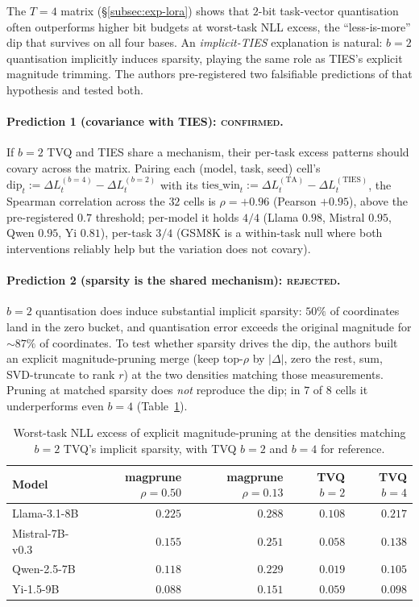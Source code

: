 \label{subsec:exp-b2-mechanism}
The $T = 4$ matrix (\S\ref{subsec:exp-lora}) shows that $2$-bit
task-vector quantisation often outperforms higher bit budgets at
worst-task NLL excess, the ``less-is-more'' dip that survives on all
four bases. An \emph{implicit-TIES} explanation is natural: $b=2$
quantisation implicitly induces sparsity, playing the same role as
TIES's explicit magnitude trimming. The authors pre-registered two falsifiable
predictions of that hypothesis and tested both.

\paragraph{Prediction 1 (covariance with TIES): \textsc{confirmed}.}
If $b=2$ TVQ and TIES share a mechanism, their per-task excess patterns
should covary across the matrix. Pairing each (model, task, seed)
cell's $\text{dip}_t := \Delta L_t^{(b=4)} - \Delta L_t^{(b=2)}$ with
its $\text{ties\_win}_t := \Delta L_t^{(\mathrm{TA})} -
\Delta L_t^{(\mathrm{TIES})}$, the Spearman correlation across the $32$
cells is $\rho = +0.96$ (Pearson $+0.95$), above the pre-registered
$0.7$ threshold; per-model it holds $4/4$ (Llama $0.98$, Mistral
$0.95$, Qwen $0.95$, Yi $0.81$), per-task $3/4$ (GSM8K is a within-task
null where both interventions reliably help but the variation does not
covary).

\paragraph{Prediction 2 (sparsity is the shared mechanism):
\textsc{rejected}.} $b=2$ quantisation does induce substantial implicit
sparsity: $50\%$ of coordinates land in the zero bucket, and
quantisation error exceeds the original magnitude for $\sim 87\%$ of
coordinates. To test whether sparsity drives the dip, the authors built an
explicit magnitude-pruning merge (keep top-$\rho$ by $|\Delta|$, zero
the rest, sum, SVD-truncate to rank $r$) at the two densities matching
those measurements. Pruning at matched sparsity does \emph{not}
reproduce the dip; in $7$ of $8$ cells it underperforms even $b=4$
(Table~\ref{tab:e7-prune-vs-tvq}).

\begin{table}[t]
\centering
\caption{Worst-task NLL excess of explicit magnitude-pruning at the
densities matching $b=2$ TVQ's implicit sparsity, with TVQ $b=2$ and
$b=4$ for reference.}
\label{tab:e7-prune-vs-tvq}
\begin{tabular}{lrrrr}
\hline
Model & magprune $\rho=0.50$ & magprune $\rho=0.13$ & TVQ $b=2$ & TVQ $b=4$ \\
\hline
Llama-3.1-8B    & $0.225$ & $0.288$ & $0.108$ & $0.217$ \\
Mistral-7B-v0.3 & $0.155$ & $0.251$ & $0.058$ & $0.138$ \\
Qwen-2.5-7B     & $0.118$ & $0.229$ & $0.019$ & $0.105$ \\
Yi-1.5-9B       & $0.088$ & $0.151$ & $0.059$ & $0.098$ \\
\hline
\end{tabular}
\end{table}

